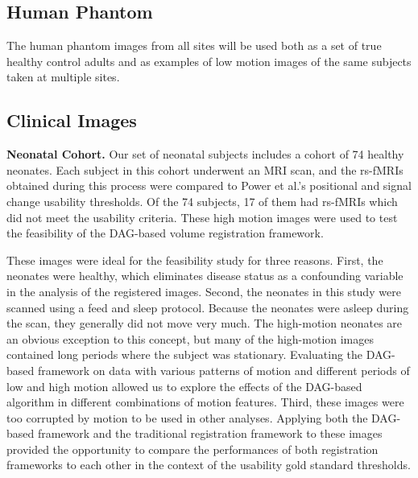 \subsection{Human Phantom}

The human phantom images from all sites will be used both as a set of true healthy control adults and as examples of low motion images of the same subjects taken at multiple sites.

\subsection{Clinical Images}

\textbf{Neonatal Cohort.} Our set of neonatal subjects includes a cohort of 74 healthy neonates. Each subject in this cohort underwent an MRI scan, and the rs-fMRIs obtained during this process were compared to Power et al.'s positional and signal change usability thresholds. Of the 74 subjects, 17 of them had rs-fMRIs which did not meet the usability criteria. These high motion images were used to test the feasibility of the DAG-based volume registration framework. 

These images were ideal for the feasibility study for three reasons. First, the neonates were healthy, which eliminates disease status as a confounding variable in the analysis of the registered images. Second, the neonates in this study were scanned using a feed and sleep protocol. Because the neonates were asleep during the scan, they generally did not move very much. The high-motion neonates are an obvious exception to this concept, but many of the high-motion images contained long periods where the subject was stationary. Evaluating the DAG-based framework on data with various patterns of motion and different periods of low and high motion allowed us to explore the effects of the DAG-based algorithm in different combinations of motion features. Third, these images were too corrupted by motion to be used in other analyses. Applying both the DAG-based framework and the traditional registration framework to these images provided the opportunity to compare the performances of both registration frameworks to each other in the context of the usability gold standard thresholds. 

